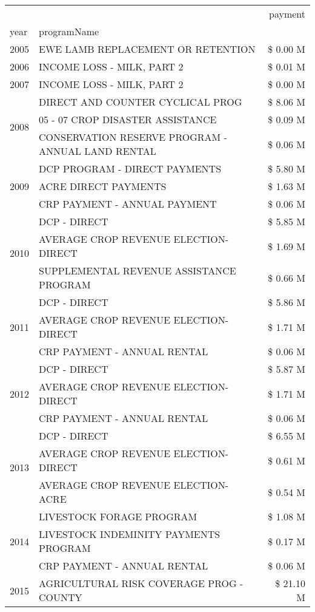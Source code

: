\begin{tabular}{llr}
\toprule
 &  & payment \\
year & programName &  \\
\midrule
2005 & EWE LAMB REPLACEMENT OR RETENTION & \$ 0.00 M \\
\cline{1-3}
2006 & INCOME LOSS - MILK, PART 2 & \$ 0.01 M \\
\cline{1-3}
2007 & INCOME LOSS - MILK, PART 2 & \$ 0.00 M \\
\cline{1-3}
\multirow[t]{3}{*}{2008} & DIRECT AND COUNTER CYCLICAL PROG & \$ 8.06 M \\
 & 05 - 07 CROP DISASTER ASSISTANCE & \$ 0.09 M \\
 & CONSERVATION RESERVE PROGRAM - ANNUAL LAND RENTAL & \$ 0.06 M \\
\cline{1-3}
\multirow[t]{3}{*}{2009} & DCP PROGRAM - DIRECT PAYMENTS & \$ 5.80 M \\
 & ACRE DIRECT PAYMENTS & \$ 1.63 M \\
 & CRP PAYMENT - ANNUAL PAYMENT & \$ 0.06 M \\
\cline{1-3}
\multirow[t]{3}{*}{2010} & DCP - DIRECT & \$ 5.85 M \\
 & AVERAGE CROP REVENUE ELECTION-DIRECT & \$ 1.69 M \\
 & SUPPLEMENTAL REVENUE ASSISTANCE PROGRAM & \$ 0.66 M \\
\cline{1-3}
\multirow[t]{3}{*}{2011} & DCP - DIRECT & \$ 5.86 M \\
 & AVERAGE CROP REVENUE ELECTION-DIRECT & \$ 1.71 M \\
 & CRP PAYMENT - ANNUAL RENTAL & \$ 0.06 M \\
\cline{1-3}
\multirow[t]{3}{*}{2012} & DCP - DIRECT & \$ 5.87 M \\
 & AVERAGE CROP REVENUE ELECTION-DIRECT & \$ 1.71 M \\
 & CRP PAYMENT - ANNUAL RENTAL & \$ 0.06 M \\
\cline{1-3}
\multirow[t]{3}{*}{2013} & DCP - DIRECT & \$ 6.55 M \\
 & AVERAGE CROP REVENUE ELECTION-DIRECT & \$ 0.61 M \\
 & AVERAGE CROP REVENUE ELECTION-ACRE & \$ 0.54 M \\
\cline{1-3}
\multirow[t]{3}{*}{2014} & LIVESTOCK FORAGE PROGRAM & \$ 1.08 M \\
 & LIVESTOCK INDEMINITY PAYMENTS PROGRAM & \$ 0.17 M \\
 & CRP PAYMENT - ANNUAL RENTAL & \$ 0.06 M \\
\cline{1-3}
\multirow[t]{3}{*}{2015} & AGRICULTURAL RISK COVERAGE PROG - COUNTY & \$ 21.10 M \\

\end{tabular}
